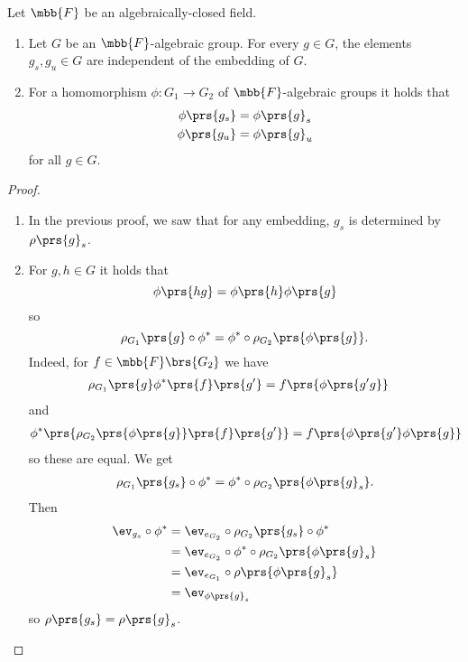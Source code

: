 \documentclass[10pt,a4paper,twoside,openany,hidelinks]{book}
\begin{document}
\begin{theorem}
Let $\mbb{F}$ be an algebraically-closed field.

\begin{enumerate}
\item Let $G$ be an $\mbb{F}$-algebraic group.
For every $g \in G$, the elements $g_s, g_u \in G$ are independent of the embedding of $G$.

\item For a homomorphism $\phi \colon G_1 \to G_2$ of $\mbb{F}$-algebraic groups it holds that
\begin{align*}
\phi\prs{g_s} &= \phi\prs{g}_s \\
\phi\prs{g_u} &= \phi\prs{g}_u
\end{align*}
for all $g \in G$.
\end{enumerate}
\end{theorem}

\begin{proof}
\begin{enumerate}
\item In the previous proof, we saw that for any embedding, $g_s$ is determined by $\rho\prs{g}_s$.

\item For $g,h \in G$ it holds that
\[\phi\prs{hg} = \phi\prs{h} \phi\prs{g}\]
so
\[\rho_{G_1}\prs{g} \circ \phi^* = \phi^* \circ \rho_{G_2} \prs{\phi\prs{g}} \text{.}\]
Indeed, for $f \in \mbb{F}\brs{G_2}$ we have
\begin{align*}
\rho_{G_1}\prs{g}\phi^*\prs{f}\prs{g'} &= f\prs{\phi\prs{g'g}}
\end{align*}
and
\begin{align*}
\phi^*\prs{\rho_{G_2}\prs{\phi\prs{g}}\prs{f}\prs{g'}} &= f\prs{\phi\prs{g'}\phi\prs{g}}
\end{align*}
so these are equal.
We get
\begin{align*}
\rho_{G_1}\prs{g_s} \circ \phi^* = \phi^* \circ \rho_{G_2}\prs{\phi\prs{g}_s} \text{.}
\end{align*}
Then
\begin{align*}
\ev_{g_s} \circ \phi^* &= \ev_{e_{G_2}} \circ \rho_{G_2}\prs{g_s} \circ \phi^*
\\&= \ev_{e_{G_2}} \circ \phi^* \circ \rho_{G_2}\prs{\phi\prs{g}_s}
\\&= \ev_{e_{G_1}} \circ \rho\prs{\phi\prs{g}_s}
\\&= \ev_{\phi\prs{g}_s}
\end{align*}
so $\rho\prs{g_s} = \rho\prs{g}_s$.
\end{enumerate}
\end{proof}
\end{document}
